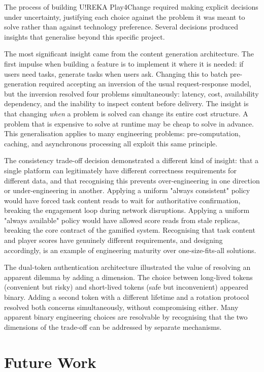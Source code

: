 The process of building U!REKA Play4Change required making explicit decisions under uncertainty, justifying each choice against the problem it was meant to solve rather than against technology preference. Several decisions produced insights that generalise beyond this specific project.

The most significant insight came from the content generation architecture. The first impulse when building a feature is to implement it where it is needed: if users need tasks, generate tasks when users ask. Changing this to batch pre-generation required accepting an inversion of the usual request-response model, but the inversion resolved four problems simultaneously: latency, cost, availability dependency, and the inability to inspect content before delivery. The insight is that changing \textit{when} a problem is solved can change its entire cost structure. A problem that is expensive to solve at runtime may be cheap to solve in advance. This generalisation applies to many engineering problems: pre-computation, caching, and asynchronous processing all exploit this same principle.

The consistency trade-off decision demonstrated a different kind of insight: that a single platform can legitimately have different correctness requirements for different data, and that recognising this prevents over-engineering in one direction or under-engineering in another. Applying a uniform "always consistent" policy would have forced task content reads to wait for authoritative confirmation, breaking the engagement loop during network disruptions. Applying a uniform "always available" policy would have allowed score reads from stale replicas, breaking the core contract of the gamified system. Recognising that task content and player scores have genuinely different requirements, and designing accordingly, is an example of engineering maturity over one-size-fits-all solutions.

The dual-token authentication architecture illustrated the value of resolving an apparent dilemma by adding a dimension. The choice between long-lived tokens (convenient but risky) and short-lived tokens (safe but inconvenient) appeared binary. Adding a second token with a different lifetime and a rotation protocol resolved both concerns simultaneously, without compromising either. Many apparent binary engineering choices are resolvable by recognising that the two dimensions of the trade-off can be addressed by separate mechanisms.

\section{Future Work}

